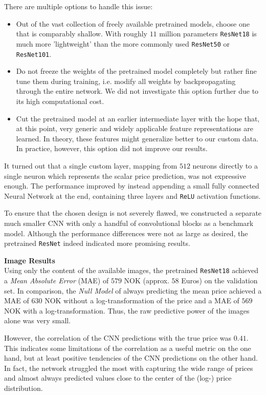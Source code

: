 There are multiple options to handle this issue:
\begin{itemize}
      \item Out of the vast collection of freely available pretrained models, choose one that is comparably shallow.
            With roughly $11$ million parameters \texttt{ResNet18} is much more 'lightweight' than the more commonly used \texttt{ResNet50} or \texttt{ResNet101}.
      \item Do not freeze the weights of the pretrained model completely but rather fine tune them during training, i.e. modify all weights by backpropagating through the entire network.
            We did not investigate this option further due to its high computational cost.
      \item Cut the pretrained model at an earlier intermediate layer with the hope that, at this point, very generic and widely applicable feature representations are learned.
            In theory, these features might generalize better to our custom data.
            In practice, however, this option did not improve our results.
\end{itemize}

It turned out that a single custom layer, mapping from $512$ neurons directly to a single neuron which represents the scalar price prediction, was not expressive enough.
The performance improved by instead appending a small fully connected Neural Network at the end, containing three layers and \texttt{ReLU} activation functions.

To ensure that the chosen design is not severely flawed, we constructed a separate much smaller CNN with only a handful of convolutional blocks as a benchmark model.
Although the performance differences were not as large as desired, the pretrained \texttt{ResNet} indeed indicated more promising results.


\textbf{Image Results} \\
Using only the content of the available images, the pretrained \texttt{ResNet18} achieved a \emph{Mean Absolute Error} (MAE) of $579$ NOK (approx. $58$ Euros) on the validation set.
In comparison, the \emph{Null Model} of always predicting the mean price achieved a MAE of $630$ NOK without a log-transformation of the price and a MAE of $569$ NOK with a log-transformation.
Thus, the raw predictive power of the images alone was very small.

However, the correlation of the CNN predictions with the true price was $0.41$.
This indicates some limitations of the correlation as a useful metric on the one hand, but at least positive tendencies of the CNN predictions on the other hand.
In fact, the network struggled the most with capturing the wide range of prices and almost always predicted values close to the center of the (log-) price distribution.

